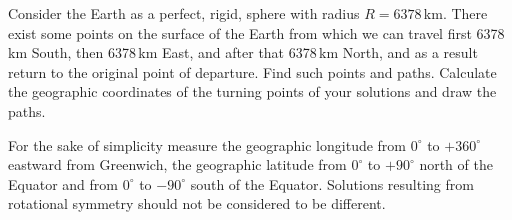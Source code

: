 Consider the Earth as a perfect, rigid, sphere with radius $R = 6378$\,km.
There exist some points on the surface of the Earth from which we can travel
first 6378\,km South, then 6378\,km East, and after that 6378\,km North, and as
a result return to the original point of departure. Find such points and paths.
Calculate the geographic coordinates of the turning points of your solutions
and draw the paths.

For the sake of simplicity measure the geographic longitude from $0^\circ$ to
$+360^\circ$ eastward from Greenwich, the geographic latitude from $0^\circ$ to
$+90^\circ$ north of the Equator and from $0^\circ$ to $-90^\circ$ south of the
Equator. Solutions resulting from rotational symmetry should not be considered
to be different.
